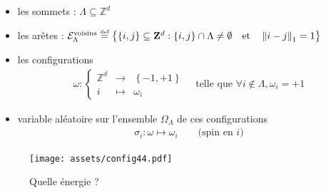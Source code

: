 \documentclass[french]{beamer}
\newcommand\eqdef{\overset{\mbox{\tiny def}}{=}}
\begin{document}
\begin{frame}
    \begin{itemize}
        \item les sommets : \(\Lambda \subseteq \mathbb{Z}^d \)
        \item les arêtes : \(\mathcal{E}_\Lambda^\text{voisins} \eqdef\left\{  
        \left\{i,j\right\} \subseteq  \mathbf{Z}^d : \left\{i,j\right\} \cap \Lambda \neq \emptyset
        \quad \text{et} \quad
        \left\Vert i - j \right\Vert_1 = 1
        \right\} \)
        \item les configurations
       	\begin{align*}
	        \omega : \left\{
	        \begin{array}{ccc}
	        \mathbb{Z}^d & \longrightarrow & \left\{-1, +1\right\} \\
	        i                         & \longmapsto       & \omega_i
	        \end{array}
	        \right. \quad \text{telle que \(\forall i \notin \Lambda, \omega_i = +1\)}
        \end{align*}
        \item variable aléatoire sur l'ensemble $\Omega_\Lambda$ de ces configurations
        \begin{align*}
        	\sigma_i : \omega \mapsto \omega_i \qquad \text{(spin en $i$)}
        \end{align*}
    \end{itemize}
\end{frame}




\begin{frame}
\begin{figure}
	\centering
	\texttt{[image: assets/config44.pdf]}
	\caption{Quelle énergie ?}
\end{figure}
\end{frame}
\end{document}
